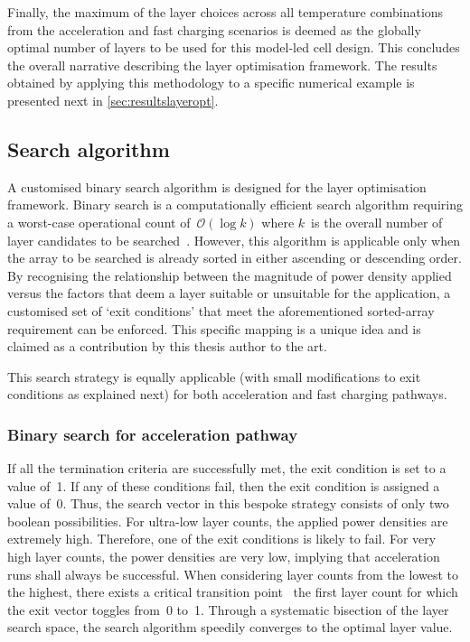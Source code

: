 Finally, the  maximum of the  layer choices across all  temperature combinations
from the  acceleration and  fast charging  scenarios is  deemed as  the globally
optimal  number of  layers  to be  used  for this  model-led  cell design.  This
concludes the overall narrative describing the layer optimisation framework. The
results obtained by applying this methodology to a specific numerical example is
presented next in \cref{sec:resultslayeropt}.


\subsection{Search algorithm}\label{sec:searchalgo}

A  customised binary  search algorithm  is designed  for the  layer optimisation
framework.  Binary  search  is  a  computationally  efficient  search  algorithm
requiring a worst-case  operational count of~$\mathcal{O}(\log k)$  where $k$~is
the  overall  number  of  layer  candidates  to  be  searched~\cite{Cormen2009}.
However, this  algorithm is  applicable only  when the array  to be  searched is
already  sorted in  either ascending  or  descending order.  By recognising  the
relationship between the  magnitude of power density applied  versus the factors
that deem a  layer suitable or unsuitable for the  application, a customised set
of `exit conditions'  that meet the aforementioned  sorted-array requirement can
be  enforced. This  specific  mapping is  a  unique  idea and  is  claimed as  a
contribution by this thesis author to the art.

This search  strategy is  equally applicable (with  small modifications  to exit
conditions as explained next) for both acceleration and fast charging pathways.

\subsubsection*{Binary search for acceleration pathway}

If all the termination criteria are  successfully met, the exit condition is set
to a  value of~1. If any  of these conditions  fail, then the exit  condition is
assigned a value of~0. Thus, the search vector in this bespoke strategy consists
of only two boolean possibilities. For ultra-low layer counts, the applied power
densities are extremely high. Therefore, one of the exit conditions is likely to
fail. For  very high layer  counts, the power  densities are very  low, implying
that acceleration runs shall always be successful. When considering layer counts
from  the lowest  to  the  highest, there  exists  a  critical transition  point
\viz~the  first layer  count  for which  the exit  vector  toggles from~0  to~1.
Through a systematic  bisection of the layer search space,  the search algorithm
speedily converges to the optimal layer value.

